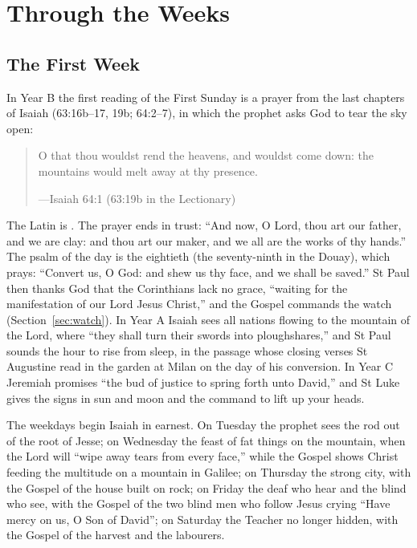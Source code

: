 \section{Through the Weeks}

\subsection{The First Week}\label{sec:week1}

In Year B the first reading of the First Sunday is a prayer from the last
chapters of Isaiah (63:16b--17, 19b; 64:2--7), in which the prophet asks God
to tear the sky open:

\begin{quote}
O that thou wouldst rend the heavens, and wouldst come down: the mountains would
melt away at thy presence.\par
{\smallskip\noindent\small ---Isaiah 64:1 (63:19b in the Lectionary)\par}
\end{quote}

\noindent The Latin is . The
prayer ends in trust: ``And now, O Lord, thou art our father, and we are clay:
and thou art our maker, and we all are the works of thy hands.'' The psalm of
the day is the eightieth (the seventy-ninth in the Douay), which prays:
``Convert us, O God: and shew us thy face, and we shall be saved.'' St Paul then thanks God that the
Corinthians lack no grace, ``waiting for the manifestation of our Lord Jesus
Christ,'' and the Gospel commands the watch (Section~\ref{sec:watch}). In Year A
Isaiah sees all nations flowing to the mountain of the Lord, where ``they shall
turn their swords into ploughshares,'' and St Paul sounds the hour to rise from
sleep, in the passage whose closing verses St Augustine read in the garden at
Milan on the day of his conversion. In Year C Jeremiah promises ``the bud of justice to
spring forth unto David,'' and St Luke
gives the signs in sun and moon and the command to lift up your heads.

The weekdays begin Isaiah in earnest. On Tuesday the prophet sees the rod out of
the root of Jesse; on Wednesday the feast of fat things on the mountain, when
the Lord will ``wipe away tears from every face,'' while the Gospel shows Christ
feeding the multitude on a mountain in Galilee; on Thursday the strong city,
with the Gospel of the house built on rock; on Friday the deaf who hear and the
blind who see, with the Gospel of the two blind men who follow Jesus crying
``Have mercy on us, O Son of David''; on Saturday the Teacher no longer hidden,
with the Gospel of the harvest and the labourers.


